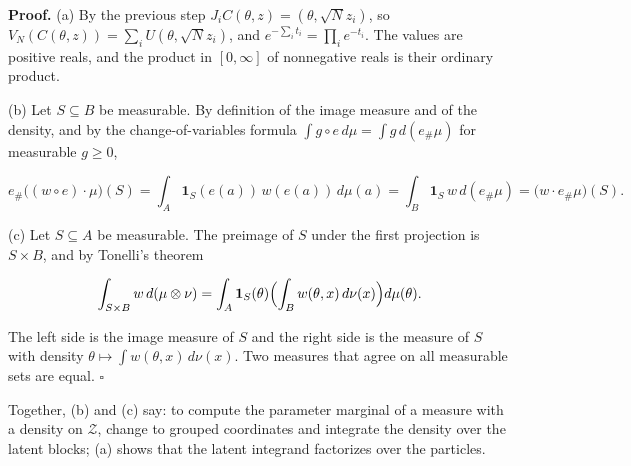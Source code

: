 \documentclass[11pt,a4paper]{report}
\begin{document}
\textbf{Proof.} (a) By the previous step \(J_iC(\theta,z)=(\theta,\sqrt Nz_i)\), so \(V_N(C(\theta,z))=\sum_iU(\theta,\sqrt Nz_i)\), and \(e^{-\sum_it_i}=\prod_ie^{-t_i}\). The values are positive reals, and the product in \([0,\infty]\) of nonnegative reals is their ordinary product.




(b) Let \(S\subseteq B\) be measurable. By definition of the image measure and of the density, and by the change-of-variables formula \(\int g\circ e\,d\mu=\int g\,d(e_\#\mu)\) for measurable \(g\ge0\),


\[e_\#\bigl((w\circ e)\cdot\mu\bigr)(S)=\int_A\mathbf 1_S(e(a))\,w(e(a))\,d\mu(a)=\int_B\mathbf 1_S\,w\,d(e_\#\mu)=\bigl(w\cdot e_\#\mu\bigr)(S).\]


(c) Let \(S\subseteq A\) be measurable. The preimage of \(S\) under the first projection is \(S\times B\), and by Tonelli's theorem


\[\int_{S\times B}w\,d(\mu\otimes\nu)=\int_A\mathbf 1_S(\theta)\Bigl(\int_Bw(\theta,x)\,d\nu(x)\Bigr)d\mu(\theta).\]


The left side is the image measure of \(S\) and the right side is the measure of \(S\) with density \(\theta\mapsto\int w(\theta,x)\,d\nu(x)\). Two measures that agree on all measurable sets are equal. \(\square\)




Together, (b) and (c) say: to compute the parameter marginal of a measure with a density on \(\mathcal Z\), change to grouped coordinates and integrate the density over the latent blocks; (a) shows that the latent integrand factorizes over the particles.
\end{document}
